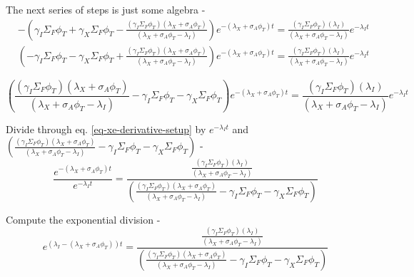 \documentclass[11pt,a4paper]{article}
\begin{document}
\noindent The next series of steps is just some algebra - 
\begin{equation}
    \begin{split}
        & -(\gamma_I\Sigma_F\phi_T+\gamma_X\Sigma_F\phi_T-\frac{(\gamma_I\Sigma_F\phi_T)(\lambda_X+\sigma_A\phi_T)}{(\lambda_X+\sigma_A\phi_T-\lambda_I)})e^{-(\lambda_X+\sigma_A\phi_T)t}=\frac{(\gamma_I\Sigma_F\phi_T)(\lambda_I)}{(\lambda_X+\sigma_A\phi_T-\lambda_I)}e^{-\lambda_I t} \\
        & (-\gamma_I\Sigma_F\phi_T-\gamma_X\Sigma_F\phi_T+\frac{(\gamma_I\Sigma_F\phi_T)(\lambda_X+\sigma_A\phi_T)}{(\lambda_X+\sigma_A\phi_T-\lambda_I)})e^{-(\lambda_X+\sigma_A\phi_T)t}=\frac{(\gamma_I\Sigma_F\phi_T)(\lambda_I)}{(\lambda_X+\sigma_A\phi_T-\lambda_I)}e^{-\lambda_I t}
    \end{split}
\end{equation}
\vspace{\baselineskip}

\begin{equation} \label{eq-xe-derivative-setup}
        (\frac{(\gamma_I\Sigma_F\phi_T)(\lambda_X+\sigma_A\phi_T)}{(\lambda_X+\sigma_A\phi_T-\lambda_I)}-\gamma_I\Sigma_F\phi_T-\gamma_X\Sigma_F\phi_T)e^{-(\lambda_X+\sigma_A\phi_T)t}=\frac{(\gamma_I\Sigma_F\phi_T)(\lambda_I)}{(\lambda_X+\sigma_A\phi_T-\lambda_I)}e^{-\lambda_I t}
\end{equation}
\vspace{\baselineskip}

\noindent Divide through eq. \ref{eq-xe-derivative-setup} by $e^{-\lambda_I t}$ and $(\frac{(\gamma_I\Sigma_F\phi_T)(\lambda_X+\sigma_A\phi_T)}{(\lambda_X+\sigma_A\phi_T-\lambda_I)}-\gamma_I\Sigma_F\phi_T-\gamma_X\Sigma_F\phi_T)$ -
\begin{equation} 
    \frac{e^{-(\lambda_X+\sigma_A\phi_T)t}}{e^{-\lambda_I t}}=\frac{\frac{(\gamma_I\Sigma_F\phi_T)(\lambda_I)}{(\lambda_X+\sigma_A\phi_T-\lambda_I)}}{(\frac{(\gamma_I\Sigma_F\phi_T)(\lambda_X+\sigma_A\phi_T)}{(\lambda_X+\sigma_A\phi_T-\lambda_I)}-\gamma_I\Sigma_F\phi_T-\gamma_X\Sigma_F\phi_T)}
\end{equation}
\vspace{\baselineskip}

\noindent Compute the exponential division - 
\begin{equation}
    e^{(\lambda_I-(\lambda_X+\sigma_A\phi_T))t}=\frac{\frac{(\gamma_I\Sigma_F\phi_T)(\lambda_I)}{(\lambda_X+\sigma_A\phi_T-\lambda_I)}}{(\frac{(\gamma_I\Sigma_F\phi_T)(\lambda_X+\sigma_A\phi_T)}{(\lambda_X+\sigma_A\phi_T-\lambda_I)}-\gamma_I\Sigma_F\phi_T-\gamma_X\Sigma_F\phi_T)}
\end{equation}
\vspace{\baselineskip}
\end{document}
